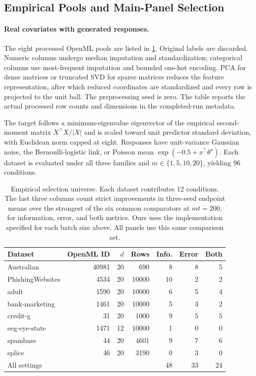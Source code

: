 \documentclass[10pt,twoside,letterpaper]{article}
\begin{document}
\subsection{Empirical Pools and Main-Panel Selection}
\label{app:empirical-selection}

\paragraph{Real covariates with generated responses.}
The eight processed OpenML pools are listed in
\cref{tab:empirical-universe}. Original labels are discarded. Numeric
columns undergo median imputation and standardization; categorical
columns use most-frequent imputation and bounded one-hot encoding.
PCA for dense matrices or truncated SVD for sparse matrices reduces
the feature representation, after which reduced coordinates are
standardized and every row is projected to the unit ball. The
preprocessing seed is zero. The table reports the actual processed
row counts and dimensions in the completed-run metadata.

The target follows a minimum-eigenvalue eigenvector of the empirical
second-moment matrix $X^\top X/|X|$ and is scaled toward unit predictor standard deviation,
with Euclidean norm capped at eight. Responses have unit-variance
Gaussian noise, the Bernoulli-logistic link, or Poisson mean
$\exp(-0.5+x^\top\theta^\star)$. Each dataset is evaluated under all
three families and $m\in\{1,5,10,20\}$, yielding 96 conditions.

\begin{table}[htbp]
\centering
\begin{tabular}{lrrrrrr}
\toprule
Dataset & OpenML ID & $d$ & Rows & Info. & Error & Both\\
\midrule
Australian      & 40981 & 20 &   690 &  8 & 8 & 5\\
PhishingWebsites &  4534 & 20 & 10000 & 10 & 2 & 2\\
adult           &  1590 & 20 & 10000 &  6 & 5 & 4\\
bank-marketing  &  1461 & 20 & 10000 &  5 & 3 & 2\\
credit-g        &    31 & 20 &  1000 &  9 & 5 & 5\\
eeg-eye-state   &  1471 & 12 & 10000 &  1 & 0 & 0\\
spambase        &    44 & 20 &  4601 &  9 & 7 & 6\\
splice          &    46 & 20 &  3190 &  0 & 3 & 0\\
\midrule
All settings    &       &    &       & 48 & 33 & 24\\
\bottomrule
\end{tabular}
\caption{Empirical selection universe. Each dataset contributes 12
conditions. The last three columns count strict improvements in
three-seed endpoint means over the strongest of the six common
comparators at $mt=200$, for information, error, and both metrics.
Ours uses the implementation specified for each batch size above.
All panels use this same comparison set.}
\label{tab:empirical-universe}
\end{table}
\end{document}
